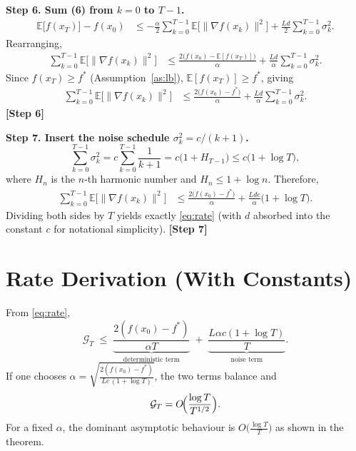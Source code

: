 \documentclass{article}
\newcommand{\E}{\mathbb{E}}
\begin{document}
\noindent\textbf{Step 6. Sum (6) from $k=0$ to $T-1$.}
\begin{align}
\E\!\bigl[f(x_{T})\bigr]-f(x_{0})
 &\le -\frac{\alpha}{2}\sum_{k=0}^{T-1}\E\!\bigl[\|\nabla f(x_{k})\|^{2}\bigr]
   +\frac{L d}{2}\sum_{k=0}^{T-1}\sigma_{k}^{2}. \tag{7}
\end{align}
Rearranging,
\begin{align}
\sum_{k=0}^{T-1}\E\!\bigl[\|\nabla f(x_{k})\|^{2}\bigr]
 &\le \frac{2\bigl(f(x_{0})- \E[f(x_{T})]\bigr)}{\alpha}
   +\frac{L d}{\alpha}\sum_{k=0}^{T-1}\sigma_{k}^{2}. \tag{8}
\end{align}
Since $f(x_{T})\ge f^{*}$ (Assumption~\ref{as:lb}), $\E[f(x_{T})]\ge f^{*}$, giving
\begin{align}
\sum_{k=0}^{T-1}\E\!\bigl[\|\nabla f(x_{k})\|^{2}\bigr]
 &\le \frac{2\bigl(f(x_{0})-f^{*}\bigr)}{\alpha}
   +\frac{L d}{\alpha}\sum_{k=0}^{T-1}\sigma_{k}^{2}. \tag{9}
\end{align}
\noindent\textbf{[Step 6]}

\noindent\textbf{Step 7. Insert the noise schedule $\sigma_{k}^{2}=c/(k+1)$.}
\[
\sum_{k=0}^{T-1}\sigma_{k}^{2}=c\sum_{k=0}^{T-1}\frac{1}{k+1}
   =c\bigl(1+H_{T-1}\bigr)\le c\bigl(1+\log T\bigr),
\]
where $H_{n}$ is the $n$‑th harmonic number and $H_{n}\le 1+\log n$. Therefore,
\begin{align}
\sum_{k=0}^{T-1}\E\!\bigl[\|\nabla f(x_{k})\|^{2}\bigr]
 &\le \frac{2\bigl(f(x_{0})-f^{*}\bigr)}{\alpha}
   +\frac{L d c}{\alpha}\bigl(1+\log T\bigr). \tag{10}
\end{align}
Dividing both sides by $T$ yields exactly \eqref{eq:rate} (with $d$ absorbed into the constant $c$ for notational simplicity). \qedhere
\noindent\textbf{[Step 7]}

\section*{Rate Derivation (With Constants)}
From \eqref{eq:rate},
\[
\mathcal G_{T}
\;\le\;
\underbrace{\frac{2(f(x_{0})-f^{*})}{\alpha T}}_{\text{deterministic term}}
\;+\;
\underbrace{\frac{L\alpha c (1+\log T)}{T}}_{\text{noise term}}.
\]
If one chooses $\alpha = \sqrt{\frac{2(f(x_{0})-f^{*})}{L c\, (1+\log T)}}$, the two terms balance and
\[
\mathcal G_{T}=O\!\Bigl(\frac{\log T}{T^{1/2}}\Bigr).
\]
For a fixed $\alpha$, the dominant asymptotic behaviour is $O\bigl(\frac{\log T}{T}\bigr)$ as shown in the theorem.
\end{document}

